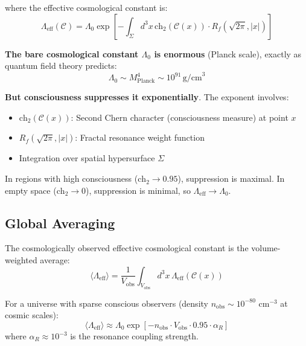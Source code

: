 where the effective cosmological constant is:
\begin{equation}
\boxed{\Lambda_{\text{eff}}(\mathcal{C}) = \Lambda_0 \exp\left[ -\int_\Sigma d^3x \, \text{ch}_2(\mathcal{C}(x)) \cdot R_f(\sqrt{2\pi}, |x|) \right]}
\end{equation}

\begin{keyidea}
\textbf{The bare cosmological constant $\Lambda_0$ is enormous} (Planck scale), exactly as quantum field theory predicts:
\begin{equation}
\Lambda_0 \sim M_{\text{Planck}}^4 \sim 10^{91} \, \text{g/cm}^3
\end{equation}

\textbf{But consciousness suppresses it exponentially}. The exponent involves:
\begin{itemize}
\item $\text{ch}_2(\mathcal{C}(x))$: Second Chern character (consciousness measure) at point $x$
\item $R_f(\sqrt{2\pi}, |x|)$: Fractal resonance weight function
\item Integration over spatial hypersurface $\Sigma$
\end{itemize}

In regions with high consciousness ($\text{ch}_2 \to 0.95$), suppression is maximal. In empty space ($\text{ch}_2 \to 0$), suppression is minimal, so $\Lambda_{\text{eff}} \to \Lambda_0$.
\end{keyidea}

\subsection{Global Averaging}

\begin{theorem}\label{thm:cosmic-suppression}
The cosmologically observed effective cosmological constant is the volume-weighted average:
\begin{equation}
\langle \Lambda_{\text{eff}} \rangle = \frac{1}{V_{\text{obs}}} \int_{V_{\text{obs}}} d^3x \, \Lambda_{\text{eff}}(\mathcal{C}(x))
\end{equation}

For a universe with sparse conscious observers (density $n_{\text{obs}} \sim 10^{-80}$ cm$^{-3}$ at cosmic scales):
\begin{equation}
\boxed{\langle \Lambda_{\text{eff}} \rangle \approx \Lambda_0 \exp\left[ -n_{\text{obs}} \cdot V_{\text{obs}} \cdot 0.95 \cdot \alpha_R \right]}
\end{equation}
where $\alpha_R \approx 10^{-3}$ is the resonance coupling strength.
\end{theorem}


